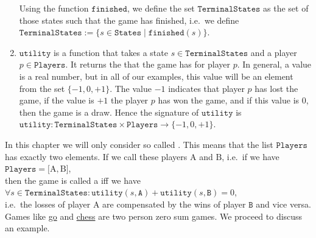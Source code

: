 \begin{enumerate}
      Using the function $\texttt{finished}$, we define the set $\texttt{TerminalStates}$ as the set of those
      states such that the game has finished,  i.e.~we define 
      \\[0.2cm]
      \hspace*{1.3cm}
      $\texttt{TerminalStates} := \{ s \in \texttt{States} \mid \texttt{finished}(s) \}$.
\item $\texttt{utility}$ is a function that takes a state $s \in \texttt{TerminalStates}$ and a player $p \in \texttt{Players}$.  It returns
      the  that the game has for player $p$.  In general, a value is a real number,  but in all of
      our examples, this value will be an element from the set $\{-1, 0, +1\}$.  The value $-1$ indicates that
      player $p$ has lost the game, if the value is $+1$ the player $p$ has won the game, and if this value is
      $0$, then the game is a draw.  Hence the signature of $\texttt{utility}$ is
      \\[0.2cm]
      \hspace*{1.3cm}
      $\texttt{utility}: \texttt{TerminalStates} \times \texttt{Players} \rightarrow \{ -1, 0, +1\}$.
\end{enumerate}
In this chapter we will only consider so called .  
This means that the list $\texttt{Players}$ has exactly two elements.  If we call these players $\mathrm{A}$ and $\mathrm{B}$, i.e.~if we have
\\[0.2cm]
\hspace*{1.3cm}
$\texttt{Players} = \bigl[ \mathrm{A}, \mathrm{B} \bigr]$,
\\[0.2cm]
then the game is called a   iff we have
\\[0.2cm]
\hspace*{1.3cm}
$\forall s \in \texttt{TerminalStates}:\texttt{utility}(s, \texttt{A}) + \texttt{utility}(s, \texttt{B}) = 0$,
\\[0.2cm]
i.e.~the losses of player $\mathrm{A}$ are compensated by the wins of player $\texttt{B}$ and vice versa.
Games like \href{https://en.wikipedia.org/wiki/Go_(game)}{go} and 
\href{https://en.wikipedia.org/wiki/Chess}{chess} are two person zero sum games.
We proceed to discuss an example.

